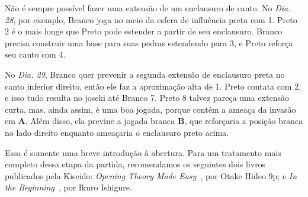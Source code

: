 Não é sempre possível fazer uma extensão de um enclausuro de canto. No \emph{Dia. 28}, por exemplo, Branco joga no meio da esfera de influência preta com 1. Preto 2 é o mais longe que Preto pode estender a partir de seu enclausuro. Branco precisa construir uma base para suas pedras estendendo para 3, e Preto reforça seu canto com 4.

No \emph{Dia. 29}, Branco quer prevenir a segunda extensão de enclausuro preta no canto inferior direito, então ele faz a aproximação alta de 1. Preto contata com 2, e isso tudo resulta no joseki até Branco 7. Preto 8 talvez pareça uma extensão curta, mas, ainda assim, é uma boa jogada, porque contém a ameaça da invasão em \textbf{A}. Além disso, ela previne a jogada branca \textbf{B}, que reforçaria a posição branca no lado direito enquanto ameaçaria o enclausuro preto acima.

Essa é somente uma breve introdução à abertura. Para um tratamento mais completo dessa etapa da partida, recomendamos os seguintes dois livros publicados pela Kiseido: \emph{Opening Theory Made Easy}~\cite{otake_opening_theory_made_easy}, por Otake Hideo 9p; e \emph{In the Beginning}~\cite{ikure_in_the_beginning}, por Ikuro Ishigure.